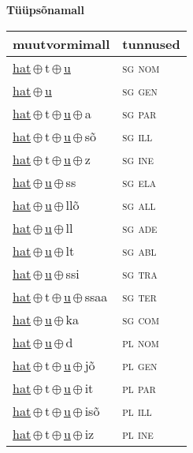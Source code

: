 

\vspace{3.5em}
\noindent \begin{minipage}{\textwidth}
\noindent \textbf{Tüüpsõnamall \,}\\

\begin{sideways}
\begin{tabular}{l l}
muutvormimall & tunnused \\
\hline
\underline{hat}\,$\oplus$\,t\,$\oplus$\,\underline{u} & \textsc{ sg nom } \\
\underline{hat}\,$\oplus$\,\underline{u} & \textsc{ sg gen } \\
\underline{hat}\,$\oplus$\,t\,$\oplus$\,\underline{u}\,$\oplus$\,a & \textsc{ sg par } \\
\underline{hat}\,$\oplus$\,t\,$\oplus$\,\underline{u}\,$\oplus$\,sõ & \textsc{ sg ill } \\
\underline{hat}\,$\oplus$\,t\,$\oplus$\,\underline{u}\,$\oplus$\,z & \textsc{ sg ine } \\
\underline{hat}\,$\oplus$\,\underline{u}\,$\oplus$\,ss & \textsc{ sg ela } \\
\underline{hat}\,$\oplus$\,\underline{u}\,$\oplus$\,llõ & \textsc{ sg all } \\
\underline{hat}\,$\oplus$\,\underline{u}\,$\oplus$\,ll & \textsc{ sg ade } \\
\underline{hat}\,$\oplus$\,\underline{u}\,$\oplus$\,lt & \textsc{ sg abl } \\
\underline{hat}\,$\oplus$\,\underline{u}\,$\oplus$\,ssi & \textsc{ sg tra } \\
\underline{hat}\,$\oplus$\,t\,$\oplus$\,\underline{u}\,$\oplus$\,ssaa & \textsc{ sg ter } \\
\underline{hat}\,$\oplus$\,\underline{u}\,$\oplus$\,ka & \textsc{ sg com } \\
\underline{hat}\,$\oplus$\,\underline{u}\,$\oplus$\,d & \textsc{ pl nom } \\
\underline{hat}\,$\oplus$\,t\,$\oplus$\,\underline{u}\,$\oplus$\,jõ & \textsc{ pl gen } \\
\underline{hat}\,$\oplus$\,t\,$\oplus$\,\underline{u}\,$\oplus$\,it & \textsc{ pl par } \\
\underline{hat}\,$\oplus$\,t\,$\oplus$\,\underline{u}\,$\oplus$\,isõ & \textsc{ pl ill } \\
\underline{hat}\,$\oplus$\,t\,$\oplus$\,\underline{u}\,$\oplus$\,iz & \textsc{ pl ine } \\

\end{tabular}
\end{sideways}
\end{minipage}
